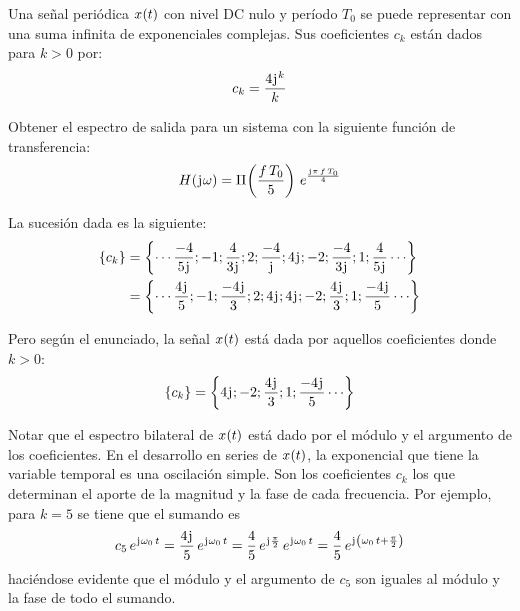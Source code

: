 \begin{mdframed}[style=ExampleFrame]
    \begin{example}
        \label{ej:hermitiana}
    \end{example}
    Una señal periódica $\fx[x]{t}$ con nivel DC nulo y período $T_0$ se puede representar con una suma infinita de exponenciales complejas.
    Sus coeficientes $c_k$ están dados para $k>0$ por:
    \[
        c_k = \frac{4 \iu^k}{k}
    \]

    Obtener el espectro de salida para un sistema con la siguiente función de transferencia:
    \[
        \fx[H]{\iu \omega} =
        \pulse{f \, T_0}{5}
        \, e^\frac{\iu \pi \, f \, T_0}{4}
    \]
    
    
    La sucesión dada es la siguiente:
    \begin{align*}
        \inBraces{c_k}
        & = \inBraces{\cdots \frac{-4}{5 \iu} ; -1 ; \frac{4}{3 \iu} ; 2 ; \frac{-4}{\iu} ; 4 \iu ; -2 ; \frac{-4}{3 \iu} ; 1 ; \frac{4}{5 \iu} \cdots}
        \\
        & = \inBraces{\cdots \frac{4 \iu}{5} ; -1 ; \frac{-4 \iu}{3} ; 2 ; 4 \iu ; 4 \iu ; -2 ; \frac{4 \iu}{3} ; 1 ; \frac{-4 \iu}{5} \cdots}
    \end{align*}

    Pero según el enunciado, la señal $\fx[x]{t}$ está dada por aquellos coeficientes donde $k>0$:
    \[
        \inBraces{c_k} = \inBraces{4 \iu ; -2 ; \frac{4 \iu}{3} ; 1 ; \frac{-4 \iu}{5} \cdots}
    \]

    Notar que el espectro bilateral de $\fx[x]{t}$ está dado por el módulo y el argumento de los coeficientes.
    En el desarrollo en series de $\fx[x]{t}$, la exponencial que tiene la variable temporal es una oscilación simple.
    Son los coeficientes $c_k$ los que determinan el aporte de la magnitud y la fase de cada frecuencia.
    Por ejemplo, para $k=5$ se tiene que el sumando es
    \[
        c_5 \, e^{\iu \omega_0 \, t}
        = \frac{4 \iu}{5} \, e^{\iu \omega_0 \, t}
        = \frac{4}{5} \, e^{\iu \frac{\pi}{2}} \, e^{\iu \omega_0 \, t}
        = \frac{4}{5} \, e^{\iu \inParentheses{\omega_0 \, t + \frac{\pi}{2}}}
    \]
    haciéndose evidente que el módulo y el argumento de $c_5$ son iguales al módulo y la fase de todo el sumando.


\end{mdframed}
